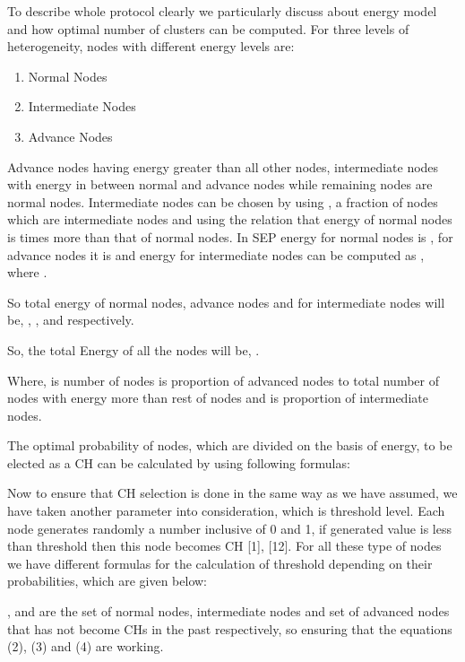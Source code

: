 \documentclass[conference]{IEEEtran}
\begin{document}
To describe whole protocol clearly we particularly discuss about energy model and how optimal number of clusters can be computed.
For three levels of heterogeneity, nodes with different energy levels are:

\begin{enumerate}
  \item Normal Nodes
  \item Intermediate Nodes
  \item Advance Nodes\\
\end{enumerate}

Advance nodes having energy greater than all other nodes, intermediate nodes with energy in between normal and advance nodes while remaining nodes are normal nodes. Intermediate nodes can be chosen by using , a fraction of nodes which are intermediate nodes and using the relation that energy of normal nodes is  times more than that of normal nodes. In SEP energy for normal nodes is , for advance nodes it is  and energy for intermediate nodes can be computed as , where .

So total energy of normal nodes, advance nodes and for intermediate nodes will be, , , and  respectively.

So, the total Energy of all the nodes will be, .


Where,  is number of nodes  is proportion of advanced nodes to total number of nodes  with energy more than rest of nodes and  is proportion of intermediate nodes.

The optimal probability of nodes, which are divided on the basis of energy, to be elected as a CH can be calculated by using following formulas:







Now to ensure that CH selection is done in the same way as we have assumed, we have taken another parameter into consideration, which is threshold level. Each node generates randomly a number inclusive of 0 and 1, if generated value is less than threshold then this node becomes CH [1], [12]. For all these type of nodes we have different formulas for the calculation of threshold depending on their probabilities, which are given below:






,  and  are the set of normal nodes, intermediate nodes and set of advanced nodes that has not become CHs in the past respectively, so ensuring that the equations (2), (3) and (4) are working.\\
\end{document}
